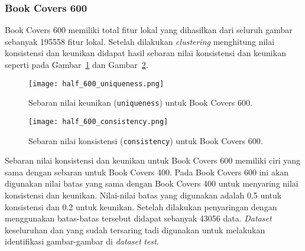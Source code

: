 \subsubsection{Book Covers 600}
Book Covers 600 memiliki total fitur lokal yang dihasilkan dari seluruh gambar sebanyak 195558 fitur lokal. Setelah dilakukan \textit{clustering} menghitung nilai konsistensi dan keunikan didapat hasil sebaran nilai konsistensi dan keunikan seperti pada Gambar~\ref{fig:half_600_uniqueness} dan Gambar~\ref{fig:half_600_consistency}.
\begin{figure}[H]
	\centering
	\texttt{[image: half\_600\_uniqueness.png]}
	\caption{Sebaran nilai keunikan (\texttt{uniqueness}) untuk Book Covers 600.}
	\label{fig:half_600_uniqueness}
\end{figure}
\begin{figure}[H]
	\centering
	\texttt{[image: half\_600\_consistency.png]}
	\caption{Sebaran nilai konsistensi (\texttt{consistency}) untuk Book Covers 600.}
	\label{fig:half_600_consistency}
\end{figure}
Sebaran nilai konsistensi dan keunikan untuk Book Covers 600 memiliki ciri yang sama dengan sebaran untuk Book Covers 400. Pada Book Covers 600 ini akan digunakan nilai batas yang sama dengan Book Covers 400 untuk menyaring nilai konsistensi dan keunikan. Nilai-nilai batas yang digunakan adalah 0.5 untuk konsistensi dan 0.2 untuk keunikan. Setelah dilakukan penyaringan dengan menggunakan batas-batas tersebut didapat sebanyak 43056 data. \textit{Dataset} keseluruhan dan yang sudah tersaring tadi digunakan untuk melakukan identifikasi gambar-gambar di \textit{dataset} \textit{test}.
